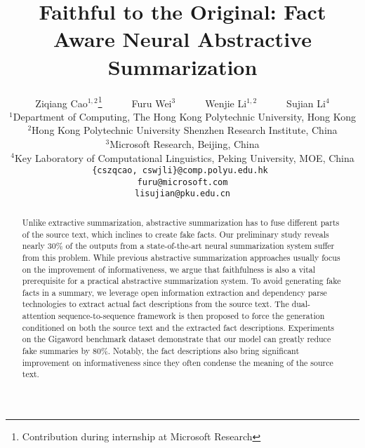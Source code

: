 \documentclass[letterpaper]{article} \usepackage{aaai18}  \usepackage{times}  \usepackage{helvet}  \usepackage{courier}  \usepackage{url}  \usepackage{graphicx}  \usepackage{amsfonts}
\begin{document}
\title{Faithful to the Original: Fact Aware Neural Abstractive Summarization}
	\author{
			Ziqiang Cao$^{1,2}$\thanks{Contribution during internship at Microsoft Research}   ~~ ~~ Furu Wei$^3$ ~~ ~~ Wenjie Li$^{1,2}$ ~~ ~~ Sujian Li$^4$\\
		$^1$Department of Computing, The Hong Kong Polytechnic University, Hong Kong\\
		$^2$Hong Kong Polytechnic University Shenzhen Research Institute, China \\
		$^3$Microsoft Research, Beijing, China\\
		$^4$Key Laboratory of Computational Linguistics, Peking University, MOE, China \\
		{\tt \{cszqcao, cswjli\}@comp.polyu.edu.hk  } \\
		{\tt furu@microsoft.com} \\
		{\tt lisujian@pku.edu.cn} \\
	}
	\maketitle
	\begin{abstract}
		Unlike extractive summarization, abstractive summarization has to fuse different parts of the source text, which inclines to create fake facts.
		Our preliminary study reveals nearly 30\% of the outputs from a state-of-the-art neural summarization system suffer from this problem.
		While previous abstractive summarization approaches usually focus on the improvement of informativeness, we argue that faithfulness is also a vital prerequisite for a practical abstractive summarization system.
		To avoid generating fake facts in a summary, we leverage open information extraction and dependency parse technologies to extract actual fact descriptions from the source text.
		The dual-attention sequence-to-sequence framework is then proposed to force the generation conditioned on both the source text and the extracted fact descriptions.
		Experiments on the Gigaword benchmark dataset demonstrate that our model can greatly reduce fake summaries by 80\%.
		Notably, the fact descriptions also bring significant improvement on informativeness since they often condense the meaning of the source text.
	\end{abstract}
	
\end{document}
